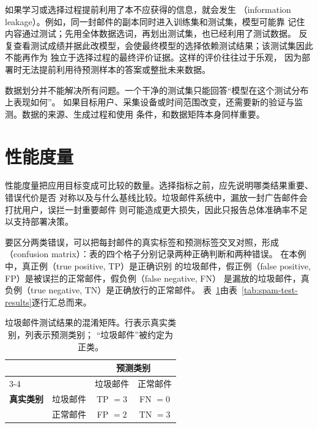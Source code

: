 如果学习或选择过程提前利用了本不应获得的信息，就会发生
（information leakage）。例如，同一封邮件的副本同时进入训练集和测试集，模型可能靠
记住内容通过测试；先用全体数据选词，再划出测试集，也已经利用了测试数据。
反复查看测试成绩并据此改模型，会使最终模型的选择依赖测试结果；该测试集因此不能再作为
独立于选择过程的最终评价证据。这样的评价往往过于乐观，
因为部署时无法提前利用待预测样本的答案或整批未来数据。

数据划分并不能解决所有问题。一个干净的测试集只能回答“模型在这个测试分布上表现如何”。
如果目标用户、采集设备或时间范围改变，还需要新的验证与监测。数据的来源、生成过程和使用
条件，和数据矩阵本身同样重要。

\section{性能度量}
\label{sec:performance-measures}

性能度量把应用目标变成可比较的数量。选择指标之前，应先说明哪类结果重要、错误代价是否
对称以及与什么基线比较。垃圾邮件系统中，漏放一封广告邮件会打扰用户，误拦一封重要邮件
则可能造成更大损失，因此只报告总体准确率不足以支持部署决策。

要区分两类错误，可以把每封邮件的真实标签和预测标签交叉对照，形成
（confusion matrix）：表的四个格子分别记录两种正确判断和两种错误。
在本例中，真正例（true positive, TP）是正确识别
的垃圾邮件，假正例（false positive, FP）是被误拦的正常邮件，假负例（false negative, FN）
是漏放的垃圾邮件，真负例（true negative, TN）是正确放行的正常邮件。
表~\ref{tab:spam-confusion-matrix}由表~\ref{tab:spam-test-results}逐行汇总而来。

\begin{table}[htbp]
  \centering
  \small
  \begin{tabular}{@{}llcc@{}}
    \toprule
    & & \multicolumn{2}{c}{\textbf{预测类别}} \\
    \cmidrule(l){3-4}
    & & 垃圾邮件 & 正常邮件 \\
    \midrule
    \textbf{真实类别} & 垃圾邮件 & TP $=3$ & FN $=0$ \\
                    & 正常邮件 & FP $=2$ & TN $=3$ \\
    \bottomrule
  \end{tabular}
  \caption{垃圾邮件测试结果的混淆矩阵。行表示真实类别，列表示预测类别；
  “垃圾邮件”被约定为正类。}
  \label{tab:spam-confusion-matrix}
\end{table}


